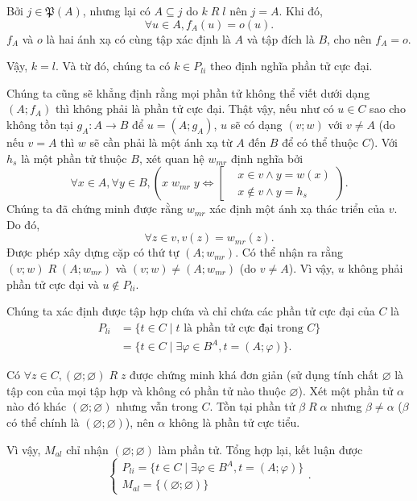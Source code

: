 Bởi $j \in \mathfrak{P}(A)$, nhưng lại có $A \subseteq j$ do $k\;R\;l$ nên $j = A$. Khi đó, 
$$
   \forall u \in A, f_A(u) = o(u).
$$
$f_A$ và $o$ là hai ánh xạ có cùng tập xác định là $A$ và tập đích là $B$, cho nên $f_A = o$.

Vậy, $k = l$. Và từ đó, chúng ta có $k \in P_{li}$ theo định nghĩa phần tử cực đại.

Chúng ta cũng sẽ khẳng định rằng mọi phần tử không thể viết dưới dạng $(A; f_A)$ thì không phải là phần tử cực đại. Thật vậy, nếu như có $u \in C$ sao cho không tồn tại $g_A: A \to B$ để $u = (A; g_A)$, $u$ sẽ có dạng $(v; w)$ với $v \neq A$ (do nếu $v = A$ thì $w$ sẽ cần phải là một ánh xạ từ $A$ đến $B$ để có thể thuộc $C$). Với $h_s$ là một phần tử thuộc $B$, xét quan hệ $w_{mr}$ định nghĩa bởi 
\begin{equation*}
   \forall x \in A, \forall y \in B,\left( x\;w_{mr}\;y \iff \left[\begin{aligned}
      &x \in v \land y = w(x) \\
      &x \notin v \land y = h_s
   \end{aligned}\right.\right).
\end{equation*}
Chúng ta đã chứng minh được rằng $w_{mr}$ xác định một ánh xạ thác triển của $v$. Do đó,
\begin{equation*}
   \forall z \in v, v(z) = w_{mr}(z).
\end{equation*}
Được phép xây dựng cặp có thứ tự $(A; w_{mr})$. Có thể nhận ra rằng $(v; w)\;R\;(A; w_{mr})$ và $(v; w) \neq (A; w_{mr})$ (do $v \neq A$). Vì vậy, $u$ không phải phần tử cực đại và $u \notin P_{li}$.

Chúng ta xác định được tập hợp chứa và chỉ chứa các phần tử cực đại của $C$ là 
\begin{align*}
   P_{li} &= \{t \in C \mid t \text{~là phần tử cực đại trong~} C\} \\
   &=  \{t \in C \mid \exists \varphi \in B^A, t = (A; \varphi)\}.
\end{align*}

Có $\forall z \in C, (\varnothing; \varnothing)\;R\;z$ được chứng minh khá đơn giản (sử dụng tính chất $\varnothing$ là tập con của mọi tập hợp và không có phần tử nào thuộc $\varnothing$). Xét một phần tử $\alpha$ nào đó khác $(\varnothing; \varnothing)$ nhưng vẫn trong $C$. Tồn tại phần tử $\beta\;R\;\alpha$ nhưng $\beta \neq \alpha$ ($\beta$ có thể chính là $(\varnothing; \varnothing)$), nên $\alpha$ không là phần tử cực tiểu. 

Vì vậy, $M_{al}$ chỉ nhận $(\varnothing; \varnothing)$ làm phần tử. Tổng hợp lại, kết luận được \begin{equation*}
   \begin{cases}
      P_{li} = \{t \in C \mid \exists \varphi \in B^A, t = (A; \varphi)\} \\
      M_{al} = \{(\varnothing; \varnothing)\}
   \end{cases}.
\end{equation*}

